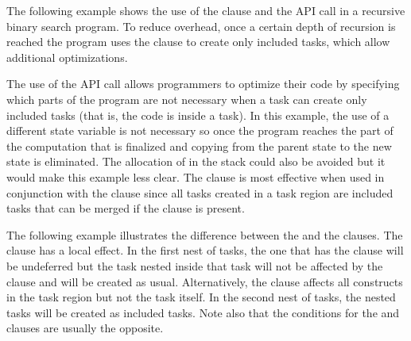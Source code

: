 

The following example shows the use of the  clause and the  
API call in a recursive binary search program. To reduce overhead, once a certain 
depth of recursion is reached the program uses the  clause to create 
only included tasks, which allow additional optimizations.

The use of the  API call allows programmers to optimize 
their code by specifying which parts of the program are not necessary when a task 
can create only included tasks (that is, the code is inside a  task). 
In this example, the use of a different state variable is not necessary so once 
the program reaches the part of the computation that is finalized and copying from 
the parent state to the new state is eliminated. The allocation of  
in the stack could also be avoided but it would make this example less clear. The 
 clause is most effective when used in conjunction with the  
clause since all tasks created in a  task region are included tasks 
that can be merged if the  clause is present.



The following example illustrates the difference between the   and the 
 clauses. The  clause has a local effect. In the first 
nest of tasks, the one that has the   clause will be undeferred but 
the task nested inside that task will not be affected by the  clause 
and will be created as usual. Alternatively, the  clause affects 
all  constructs in the  task region but not the  
task itself. In the second nest of tasks, the nested tasks will be created as included 
tasks. Note also that the conditions for the  and  clauses 
are usually the opposite.



